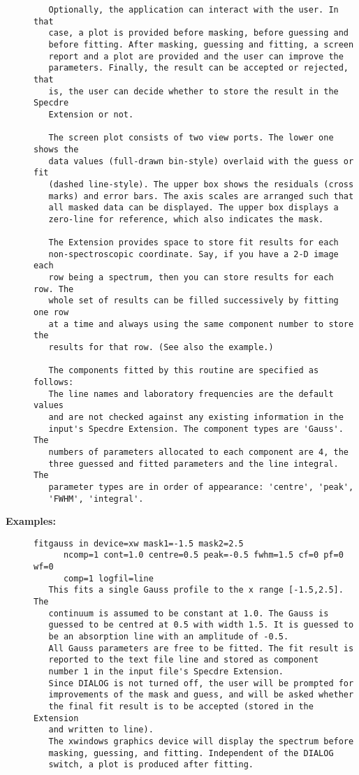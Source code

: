 \begin{description}
\begin{verbatim}
   Optionally, the application can interact with the user. In that
   case, a plot is provided before masking, before guessing and
   before fitting. After masking, guessing and fitting, a screen
   report and a plot are provided and the user can improve the
   parameters. Finally, the result can be accepted or rejected, that
   is, the user can decide whether to store the result in the Specdre
   Extension or not.

   The screen plot consists of two view ports. The lower one shows the
   data values (full-drawn bin-style) overlaid with the guess or fit
   (dashed line-style). The upper box shows the residuals (cross
   marks) and error bars. The axis scales are arranged such that
   all masked data can be displayed. The upper box displays a
   zero-line for reference, which also indicates the mask.

   The Extension provides space to store fit results for each
   non-spectroscopic coordinate. Say, if you have a 2-D image each
   row being a spectrum, then you can store results for each row. The
   whole set of results can be filled successively by fitting one row
   at a time and always using the same component number to store the
   results for that row. (See also the example.)

   The components fitted by this routine are specified as follows:
   The line names and laboratory frequencies are the default values
   and are not checked against any existing information in the
   input's Specdre Extension. The component types are 'Gauss'. The
   numbers of parameters allocated to each component are 4, the
   three guessed and fitted parameters and the line integral. The
   parameter types are in order of appearance: 'centre', 'peak',
   'FWHM', 'integral'.

\end{verbatim}

\item [{\bf Examples:}]
\begin{verbatim}
fitgauss in device=xw mask1=-1.5 mask2=2.5
      ncomp=1 cont=1.0 centre=0.5 peak=-0.5 fwhm=1.5 cf=0 pf=0 wf=0
      comp=1 logfil=line
   This fits a single Gauss profile to the x range [-1.5,2.5]. The
   continuum is assumed to be constant at 1.0. The Gauss is
   guessed to be centred at 0.5 with width 1.5. It is guessed to
   be an absorption line with an amplitude of -0.5.
   All Gauss parameters are free to be fitted. The fit result is
   reported to the text file line and stored as component
   number 1 in the input file's Specdre Extension.
   Since DIALOG is not turned off, the user will be prompted for
   improvements of the mask and guess, and will be asked whether
   the final fit result is to be accepted (stored in the Extension
   and written to line).
   The xwindows graphics device will display the spectrum before
   masking, guessing, and fitting. Independent of the DIALOG
   switch, a plot is produced after fitting.


\end{verbatim}
\end{description}
